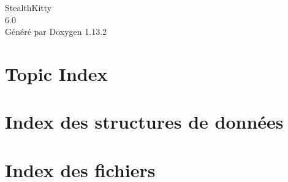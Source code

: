 \documentclass[twoside]{book}
\newcommand{\+}{\discretionary{\mbox{\scriptsize$\hookleftarrow$}}{}{}}
\newcommand{\clearemptydoublepage}{%
    \newpage{\pagestyle{empty}\cleardoublepage}%
  }
\begin{document}
  \raggedbottom
    \hypersetup{pageanchor=false,
                bookmarksnumbered=true,
                pdfencoding=unicode
               }
  \begin{titlepage}
  \vspace*{7cm}
  \begin{center}%
  {\Large Stealth\+Kitty}\\
  [1ex]\large 6.\+0 \\
  \vspace*{1cm}
  {\large Généré par Doxygen 1.13.2}\\
  \end{center}
  \end{titlepage}
  \clearemptydoublepage
  \tableofcontents
  \clearemptydoublepage
  \hypersetup{pageanchor=true}



\chapter{Topic Index}

\chapter{Index des structures de données}

\chapter{Index des fichiers}

\end{document}
